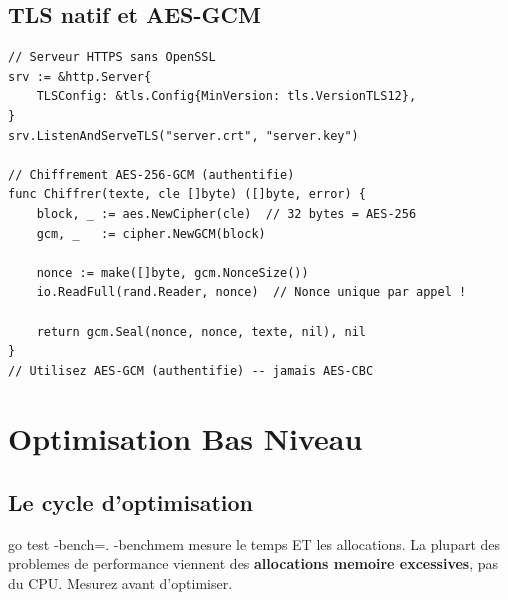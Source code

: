 \documentclass[11pt,a4paper,openany]{book}
\newcommand{\code}[1]{%
  \colorbox{GoLightGrey}{\small\ttfamily\color{GoDark}#1}}
\begin{document}
\section{TLS natif et AES-GCM}

\begin{lstlisting}[style=goStyle]
// Serveur HTTPS sans OpenSSL
srv := &http.Server{
    TLSConfig: &tls.Config{MinVersion: tls.VersionTLS12},
}
srv.ListenAndServeTLS("server.crt", "server.key")

// Chiffrement AES-256-GCM (authentifie)
func Chiffrer(texte, cle []byte) ([]byte, error) {
    block, _ := aes.NewCipher(cle)  // 32 bytes = AES-256
    gcm, _   := cipher.NewGCM(block)

    nonce := make([]byte, gcm.NonceSize())
    io.ReadFull(rand.Reader, nonce)  // Nonce unique par appel !

    return gcm.Seal(nonce, nonce, texte, nil), nil
}
// Utilisez AES-GCM (authentifie) -- jamais AES-CBC
\end{lstlisting}

\chapter{Optimisation Bas Niveau}

\section{Le cycle d'optimisation}

\begin{center}
\end{center}

\begin{boiteConseil}
\code{go test -bench=. -benchmem} mesure le temps ET les allocations.
La plupart des problemes de performance viennent des \textbf{allocations
memoire excessives}, pas du CPU. Mesurez avant d'optimiser.
\end{boiteConseil}
\end{document}
